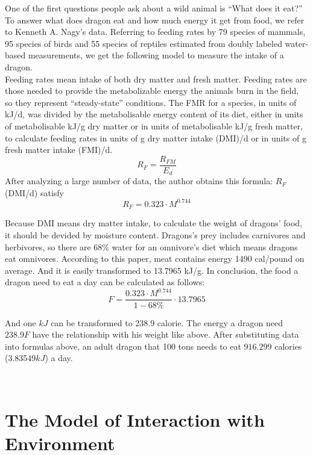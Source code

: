 \documentclass{mcmthesis}
\begin{document}
One of the first questions people ask about a wild animal is “What does it eat?” To answer what does dragon eat 
and how much energy it get from food, we refer to Kenneth A. Nagy's data. Referring to feeding rates by 79 species of mammals, 95 species of birds and 55 species of reptiles  estimated from doubly labeled water- based measurements, we get the following model to measure the intake of a dragon.\\

Feeding rates mean intake of both dry matter and fresh matter. 
Feeding rates are those needed to provide the metabolizable energy the animals burn in the field, so they represent “steady-state” conditions.
The FMR for a species, in units of kJ/d, was divided by the metabolisable energy content of its diet, 
either in units of metabolisable kJ/g dry matter or in units of metabolisable kJ/g fresh matter, 
to calculate feeding rates in units of g dry matter intake (DMI)/d or in units of g fresh matter intake (FMI)/d.
\begin{equation}
R_{F} = \frac{R_{FM}}{E_{d}}
\end{equation}
After analyzing a large number of data, the author obtains this formula: $R_{F} $ (DMI/d) satisfy
\begin{equation}
R_{F} = 0.323 \cdot M^{0.744}
\end{equation}

Because DMI means dry matter intake, to calculate the weight of dragons' food, it should be devided by moisture content.
Dragons's prey includes carnivores and herbivores, so there are 68\% water for an omnivore’s diet which means dragons eat omnivores.
According to this paper, meat contains energy 1490 cal/pound on average. And it is easily transformed to 13.7965 kJ/g.
In conclusion, the food a dragon need to eat a day can be calculated as follows:
\begin{equation}
F = \frac{0.323 \cdot M^{0.744}}{1-68\%}\cdot13.7965
\end{equation}

And one $kJ$ can be transformed to 238.9 calorie. The energy a dragon need $238.9F$ have the relationship with his weight like above.
After substituting data into formulas above, an adult dragon that 100 tons needs to eat $916.299$ calories (3.83549$kJ$) a day.


~\ \
\section{The Model of Interaction with Environment}
~\ \
\end{document}
